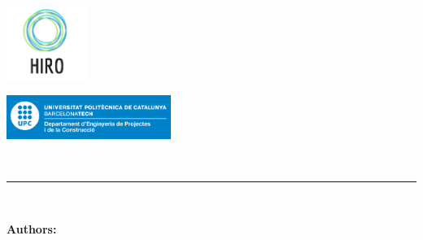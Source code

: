 
\thispagestyle{CoverPage}


\begin{center}\bf

\includegraphics[width=0.2\textwidth]{./doc_config/images/logo.png}\\
\large \researcherDept

\vspace{35pt}

\includegraphics[width=0.4\textwidth]{./doc_config/images/UPC_dpt}\\
{\large \School}

\vspace{40pt}

{\fontsize{25pt}{20pt}\selectfont \ProjectName}\\ \vspace{0.3cm}
{\fontsize{22pt}{20pt}\selectfont \ProjectsubName}


\vspace{10pt}

{\fontsize{18pt}{20pt}\selectfont \Acronym}


\textcolor{UPC_blue}{\rule{\textwidth}{.6pt}}

{\Large \DocTypeI}\\
{\Large \DocTypeII}

\end{center}

\vspace{20pt}

\textbf{Authors:}\vspace{7pt}


